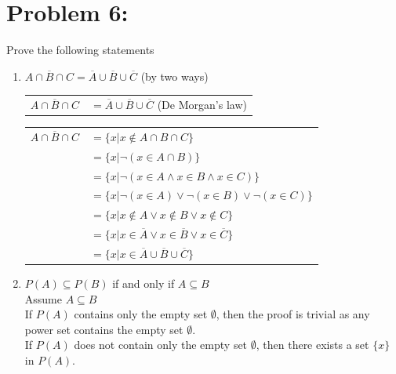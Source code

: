 \documentclass[12pt,en,a4paper]{article}
\begin{document}
	\section*{Problem 6:}
	Prove the following statements
	\begin{enumerate}
		\item $\overline{A \cap B \cap C} = \overline{A} \cup \overline{B} \cup \overline{C}$ (by two ways)\\
		
		\begin{tabular}{r l}
			$\overline{A \cap B \cap C}$ & $= \overline{A} \cup \overline{B} \cup \overline{C}$ (De Morgan's law)
		\end{tabular}
		
		\begin{tabular}{r l}
			$\overline{A \cap B \cap C}$ & $=\{x|x\notin A \cap B \cap C\}$\\
			{} & $=\{x|\neg (x \in A \cap B)\}$\\
			{} & $=\{x|\neg (x\in A \wedge x\in B \wedge x\in C)\}$\\
			{} & $=\{x|\neg(x\in A)\vee\neg(x\in B) \vee\neg(x\in C)\}$\\
			{} & $=\{x|x\notin A \vee x\notin B \vee x\notin C\}$\\
			{} & $=\{x|x\in\overline{A}\vee x\in\overline{B}\vee x\in\overline{C}\}$\\
			{} & $=\{x|x\in\overline{A}\cup\overline{B}\cup\overline{C}\}$
		\end{tabular} 
		\item $P(A) \subseteq P(B)$ if and only if $A \subseteq B$\\
		
		Assume $A \subseteq B$\\
		
		If $P(A)$ contains only the empty set $\emptyset$, then the proof is trivial as any power set contains the empty set $\emptyset$.\\
		If $P(A)$ does not contain only the empty set $\emptyset$, then there exists a set $\{x\}$ in $P(A)$.\\
		

\end{enumerate}
\end{document}
